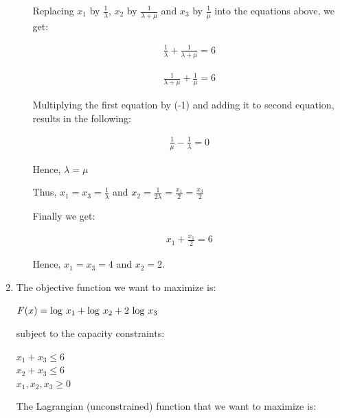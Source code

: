 \documentclass{article}
\def\lg{{\rm log}}
\begin{document}
\begin{enumerate}
\begin{itemize}
\noindent Replacing $x_1$ by ${\frac{1}{\lambda}}$, $x_2$ by
${\frac{1}{\lambda + \mu}}$ and $x_3$ by ${\frac{1}{\mu}}$ into
the equations above, we get:

\vspace{-3mm}

\begin{eqnarray*}
{\frac{1}{\lambda}} + {\frac{1}{\lambda + \mu}}  = 6
\end{eqnarray*}

\vspace{-3mm}

\begin{eqnarray*}
{\frac{1}{\lambda + \mu}} + {\frac{1}{\mu}}  = 6
\end{eqnarray*}

\noindent Multiplying the first equation by (-1) and adding it to
second equation, results in the following:

\vspace{-3mm}

\begin{eqnarray*}
{\frac{1}{\mu}} - {\frac{1}{\lambda}}  = 0
\end{eqnarray*}

\noindent Hence, $\lambda = \mu$ \bigbreak

\noindent Thus, $x_1 = x_3 = {\frac{1}{\lambda}}$ and $x_2 =
{\frac{1}{2\lambda}} = {\frac{x_1}{2}} = {\frac{x_3}{2}}$

\noindent Finally we get:

\vspace{-3mm}

\begin{eqnarray*}
x_1 + {\frac{x_1}{2}} = 6
\end{eqnarray*}

\noindent Hence, $x_1 = x_3 = 4$ and $x_2 = 2.$

\end{itemize}

\item The objective function we want to maximize is:

$F(x) = \lg\ x_1 + \lg\ x_2 + 2\ \lg\ x_3$

\noindent subject to the capacity constraints:

$x_1 + x_3 \leq 6$ \\
$x_2 + x_3 \leq 6$ \\
$x_1, x_2, x_3 \geq 0$

The Lagrangian (unconstrained) function that we want to maximize is:


\end{enumerate}
\end{document}
